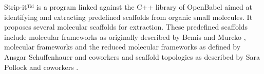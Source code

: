 Strip-it™ is a program linked against the C++ library of OpenBabel aimed at identifying and extracting predefined scaffolds from organic small molecules. It proposes several molecular scaffolds for extraction. These predefined scaffolds include molecular frameworks as originally described by Bemis and Murcko \cite{Bemis_1996}, molecular frameworks and the reduced molecular frameworks as defined by Ansgar Schuffenhauer and coworkers \cite{Schuffenhauer_2007} and scaffold topologies as described by Sara Pollock and coworkers \cite{Pollock_2008}.